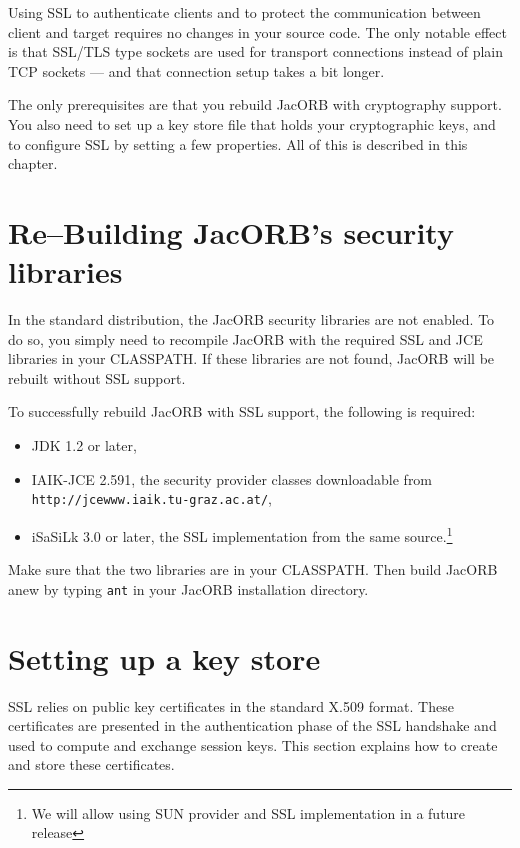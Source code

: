 \documentclass[12pt]{scrbook}
\begin{document}
Using  SSL to authenticate  clients and  to protect  the communication
between client and target requires no changes in your source code. The
only  notable  effect  is  that  SSL/TLS type  sockets  are  used  for
transport  connections  instead of  plain  TCP  sockets  --- and  that
connection setup takes a bit longer.

The only  prerequisites are that you rebuild  JacORB with cryptography
support. You  also need  to set up  a key  store file that  holds your
cryptographic   keys,  and  to   configure  SSL   by  setting   a  few
properties. All of this is described in this chapter.

\section{Re--Building JacORB's security libraries}

In the  standard distribution, the  JacORB security libraries  are not
enabled.   To do  so, you  simply need  to recompile  JacORB  with the
required SSL and JCE libraries  in your CLASSPATH.  If these libraries
are not found, JacORB will be rebuilt without SSL support.

To  successfully rebuild  JacORB with  SSL support,  the  following is
required:

\begin{itemize}
        \item JDK 1.2 or later,

        \item   IAIK-JCE   2.591,   the  security   provider   classes
downloadable from \\ {\tt http://jcewww.iaik.tu-graz.ac.at/},

     \item iSaSiLk 3.0 or later,  the SSL implementation from the same
source.\footnote{We   will   allow   using   SUN  provider   and   SSL
implementation in a future release}
\end{itemize}

Make  sure that  the two  libraries are  in your  CLASSPATH. Then build
JacORB anew by typing {\tt ant} in your JacORB installation directory.

\section{Setting up a key store}

SSL  relies   on  public  key  certificates  in   the  standard  X.509
format. These  certificates are presented in  the authentication phase
of the  SSL handshake and used  to compute and  exchange session keys.
This section explains how to create and store these certificates.
\end{document}
